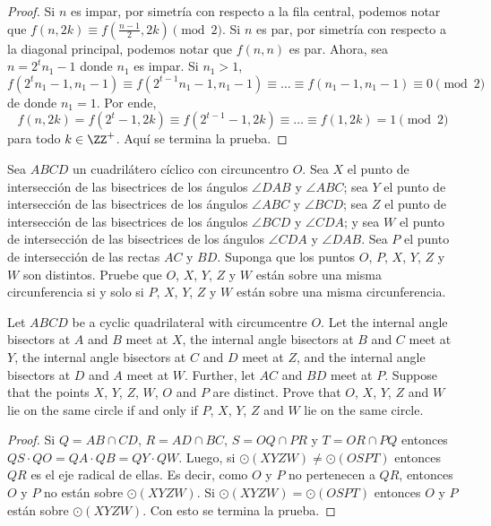 \begin{proof}
  Si $n$ es impar, por simetría con respecto a la fila central, podemos notar
  que $f(n,2k)\equiv f(\frac{n-1}{2},2k)\pmod 2$. Si $n$ es par, por simetría
  con respecto a la diagonal principal, podemos notar que $f(n,n)$ es par.
  Ahora, sea $n=2^tn_1-1$ donde $n_1$ es impar. Si $n_1>1$,
  \[
    f(2^tn_1-1,n_1-1)
    \equiv f(2^{t-1}n_1-1,n_1-1)\equiv\dots
    \equiv f(n_1-1,n_1-1)
    \equiv 0\pmod 2
  \]
  de donde $n_1=1$. Por ende,
  \[
    f(n,2k)
    =f(2^t-1,2k)
    \equiv f(2^{t-1}-1,2k)\equiv\dots
    \equiv f(1,2k)
    =1\pmod 2
  \]
  para todo $k\in\ZZ^+$. Aquí se termina la prueba.
\end{proof}

\begin{probEG}[EGMO 2022/6]
  Sea $ABCD$ un cuadrilátero cíclico con circuncentro $O$. Sea $X$ el punto de
  intersección de las bisectrices de los ángulos $\angle DAB$ y $\angle ABC$;
  sea $Y$ el punto de intersección de las bisectrices de los ángulos
  $\angle ABC$ y $\angle BCD$; sea $Z$ el punto de intersección de las
  bisectrices de los ángulos $\angle BCD$ y $\angle CDA$; y sea $W$ el punto de
  intersección de las bisectrices de los ángulos $\angle CDA$ y $\angle DAB$.
  Sea $P$ el punto de intersección de las rectas $AC$ y $BD$. Suponga que los
  puntos $O$, $P$, $X$, $Y$, $Z$ y $W$ son distintos. Pruebe que $O$, $X$, $Y$,
  $Z$ y $W$ están sobre una misma circunferencia si y solo si $P$, $X$, $Y$, $Z$
  y $W$ están sobre una misma circunferencia.
  \begin{hint}
    Let $ABCD$ be a cyclic quadrilateral with circumcentre $O$. Let the internal
    angle bisectors at $A$ and $B$ meet at $X$, the internal angle bisectors at
    $B$ and $C$ meet at $Y$, the internal angle bisectors at $C$ and $D$ meet at
    $Z$, and the internal angle bisectors at $D$ and $A$ meet at $W$. Further,
    let $AC$ and $BD$ meet at $P$. Suppose that the points $X$, $Y$, $Z$, $W$,
    $O$ and $P$ are distinct. Prove that $O$, $X$, $Y$, $Z$ and $W$ lie on the
    same circle if and only if $P$, $X$, $Y$, $Z$ and $W$ lie on the same
    circle.
  \end{hint}
\end{probEG}

\begin{proof}
  Si $Q=AB\cap CD$, $R=AD\cap BC$, $S=OQ\cap PR$ y $T=OR\cap PQ$ entonces
  $QS\cdot QO=QA\cdot QB=QY\cdot QW$. Luego, si $\odot(XYZW)\neq\odot(OSPT)$
  entonces $QR$ es el eje radical de ellas. Es decir, como $O$ y $P$ no
  pertenecen a $QR$, entonces $O$ y $P$ no están sobre $\odot(XYZW)$. Si
  $\odot(XYZW)=\odot(OSPT)$ entonces $O$ y $P$ están sobre $\odot(XYZW)$. Con
  esto se termina la prueba.
\end{proof}
